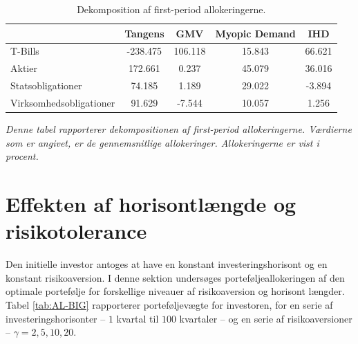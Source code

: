 \documentclass[
  a4paper,
  oneside]{memoir}
\begin{document}
\begin{table}[H]

\caption{\label{tab:AL-KOMP}Dekomposition af first-period allokeringerne.}
\centering
\begin{threeparttable}
\begin{tabular}[t]{lcccc}
\toprule
  & Tangens & GMV & Myopic Demand & IHD\\
\midrule
\rowcolor{gray!6}  T-Bills & -238.475 & 106.118 & 15.843 & 66.621\\
Aktier & 172.661 & 0.237 & 45.079 & 36.016\\
\rowcolor{gray!6}  Statsobligationer & 74.185 & 1.189 & 29.022 & -3.894\\
Virksomhedsobligationer & 91.629 & -7.544 & 10.057 & 1.256\\
\bottomrule
\end{tabular}
\begin{tablenotes}
\item \textit{Denne tabel rapporterer dekompositionen af first-period allokeringerne. Værdierne som er angivet, er de gennemsnitlige allokeringer. Allokeringerne er vist i procent.}
\end{tablenotes}
\end{threeparttable}
\end{table}

\hypertarget{effekten-af-horisontluxe6ngde-og-risikotolerance}{%
\section{Effekten af horisontlængde og risikotolerance}\label{effekten-af-horisontluxe6ngde-og-risikotolerance}}

Den initielle investor antoges at have en konstant investeringshorisont og en konstant risikoaversion. I denne sektion undersøges porteføljeallokeringen af den optimale portefølje for forskellige niveauer af risikoaversion og horisont længder. Tabel \ref{tab:AL-BIG} rapporterer porteføljevægte for investoren, for en serie af investeringshorisonter -- \(1\) kvartal til \(100\) kvartaler -- og en serie af risikoaversioner -- \(\gamma=2,5,10,20\).
\end{document}
